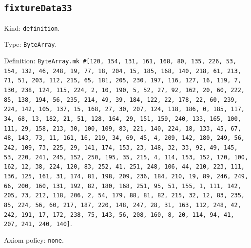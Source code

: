 \documentclass[11pt]{article}
\begin{document}
\subsection*{\texttt{fixtureData33}}
\noindent Kind: \texttt{definition}.\par
\noindent Type: \texttt{ByteArray}.\par
\noindent Definition: \texttt{ByteArray.mk \#[120, 154, 131, 161, 168, 80, 135, 226, 53, 154, 132, 46, 248, 19, 77, 18, 204, 15, 185, 168, 140, 218, 61, 213, 71, 51, 203, 112, 215, 65, 181, 205, 230, 197, 116, 127, 16, 119, 7, 130, 238, 124, 115, 224, 2, 10, 190, 5, 52, 27, 92, 162, 20, 60, 222, 85, 138, 194, 56, 235, 214, 49, 39, 184, 122, 22, 178, 22, 60, 239, 224, 142, 105, 137, 15, 168, 27, 30, 207, 124, 118, 186, 0, 185, 117, 34, 68, 13, 182, 21, 51, 128, 164, 29, 151, 159, 240, 133, 165, 100, 111, 29, 158, 213, 30, 100, 109, 83, 221, 140, 224, 18, 133, 45, 67, 48, 143, 73, 11, 161, 16, 219, 34, 69, 45, 4, 209, 142, 180, 249, 56, 242, 109, 73, 225, 29, 141, 174, 153, 23, 148, 32, 33, 92, 49, 145, 53, 220, 241, 245, 152, 250, 195, 35, 215, 4, 114, 153, 152, 170, 100, 162, 12, 38, 224, 120, 83, 252, 41, 251, 248, 106, 44, 210, 223, 111, 136, 125, 161, 31, 174, 81, 198, 209, 236, 184, 210, 19, 89, 246, 249, 66, 200, 160, 131, 192, 82, 180, 168, 251, 95, 51, 155, 1, 111, 142, 205, 73, 212, 118, 206, 2, 54, 179, 88, 81, 82, 215, 32, 12, 83, 235, 85, 224, 56, 60, 217, 187, 220, 148, 247, 28, 31, 163, 112, 248, 42, 242, 191, 17, 172, 238, 75, 143, 56, 208, 160, 8, 20, 114, 94, 41, 207, 241, 240, 140]}.\par
\noindent Axiom policy: \texttt{none}.\par
\end{document}
